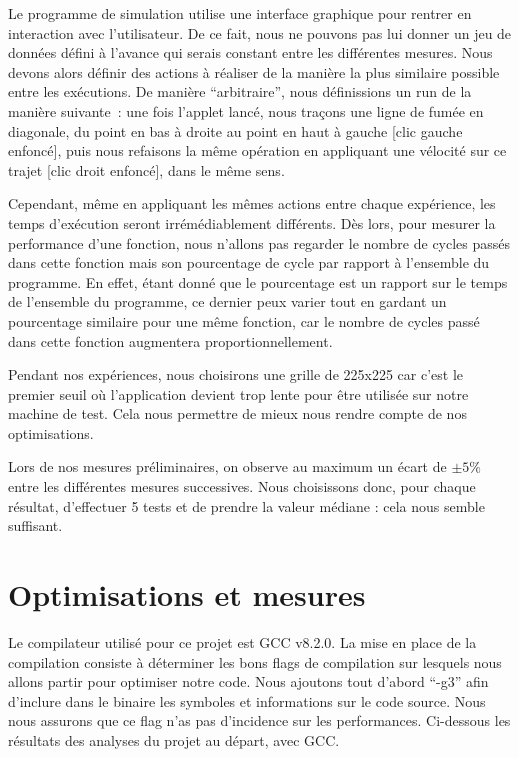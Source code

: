 \documentclass[12pt,a4paper]{article}
\begin{document}
Le programme de simulation utilise une interface graphique pour rentrer en
interaction avec l'utilisateur. De ce fait, nous ne pouvons pas lui donner un
jeu de données défini à l'avance qui serais constant entre les différentes
mesures. Nous devons alors définir des actions à réaliser de la manière la plus
similaire possible entre les exécutions. De manière \enquote{arbitraire}, nous
définissions un run de la manière suivante : une fois l'applet lancé, nous
traçons une ligne de fumée en diagonale, du point en bas à droite au point en
haut à gauche [clic gauche enfoncé], puis nous refaisons la même opération en
appliquant une vélocité sur ce trajet [clic droit enfoncé], dans le même sens.

Cependant, même en appliquant les mêmes actions entre chaque expérience, les
temps d'exécution seront irrémédiablement différents. Dès lors, pour mesurer la
performance d'une fonction, nous n'allons pas regarder le nombre de cycles
passés dans cette fonction mais son pourcentage de cycle par rapport à
l'ensemble du programme. En effet, étant donné que le pourcentage est un rapport
sur le temps de l'ensemble du programme, ce dernier peux varier tout en gardant
un pourcentage similaire pour une même fonction, car le nombre de cycles passé
dans cette fonction augmentera proportionnellement.

Pendant nos expériences, nous choisirons une grille de 225x225 car c'est le
premier seuil où l'application devient trop lente pour être utilisée sur notre
machine de test. Cela nous permettre de mieux nous rendre compte de nos
optimisations.

Lors de nos mesures préliminaires, on observe au maximum un écart de $\pm 5 \%$
entre les différentes mesures successives. Nous choisissons donc, pour chaque
résultat, d'effectuer 5 tests et de prendre la valeur médiane : cela nous semble
suffisant.

\section{Optimisations et mesures}
\label{sec.optim}

Le compilateur utilisé pour ce projet est \ac{GCC} v8.2.0. La mise en place de
la compilation consiste à déterminer les bons flags de compilation sur lesquels
nous allons partir pour optimiser notre code. Nous ajoutons tout d'abord
\enquote{-g3} afin d'inclure dans le binaire les symboles et informations sur le
code source. Nous nous assurons que ce flag n'as pas d'incidence sur les
performances. Ci-dessous les résultats des analyses du projet au départ, avec
\ac{GCC}.
\end{document}
